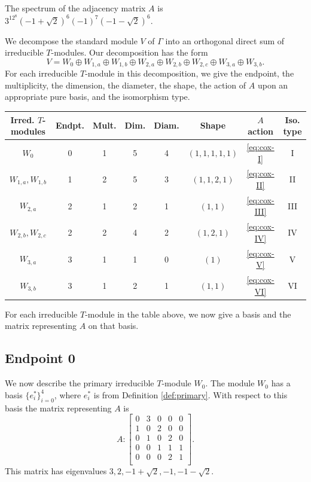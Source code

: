 \documentclass[12pt,letterpaper]{article}
\begin{document}
The spectrum of the adjacency matrix $A$ is $ 3^12^8(-1+\sqrt2)^6(-1)^7(-1-\sqrt2)^6 $.

We decompose the standard module $V$ of $\Gamma$ into an orthogonal direct sum of irreducible $T$-modules. Our decomposition has the form
\[ V = W_0 \oplus W_{1,a} \oplus W_{1,b} \oplus W_{2,a} \oplus W_{2,b} \oplus W_{2,c} \oplus W_{3,a} \oplus W_{3,b}. \]
For each irreducible $T$-module in this decomposition, we give the endpoint, the multiplicity, the dimension, the diameter, the shape, the action of $A$ upon an appropriate pure basis, and the isomorphism type.

\begin{center}
\begin{tabular}{c | c c c c c c c}
\toprule
\textbf{Irred. $T$-modules} & \textbf{Endpt.} & \textbf{Mult.} & \textbf{Dim.} & \textbf{Diam.} & \textbf{Shape} & $A$ \textbf{action} & \textbf{Iso. type} \\
\midrule
$W_0$ & 0 & 1 & 5 & 4 & $(1,1,1,1,1)$ & \eqref{eq:cox-I} & I \\
$W_{1,a}, W_{1,b}$ & 1 & 2 & 5 & 3 & $(1,1,2,1)$ & \eqref{eq:cox-II} & II \\
$W_{2,a}$ & 2 & 1 & 2 & 1 & $(1,1)$ & \eqref{eq:cox-III} & III \\
$W_{2,b}, W_{2,c}$ & 2 & 2 & 4 & 2 & $(1,2,1)$ & \eqref{eq:cox-IV} & IV \\
$W_{3,a}$ & 3 & 1 & 1 & 0 & $(1)$ & \eqref{eq:cox-V} & V \\
$W_{3,b}$ & 3 & 1 & 2 & 1 & $(1,1)$ & \eqref{eq:cox-VI} & VI \\
\bottomrule
\end{tabular}

\smallskip
{}
\end{center}

For each irreducible $T$-module in the table above, we now give a basis and the matrix representing $A$ on that basis. 

\subsection{Endpoint 0}

We now describe the primary irreducible $T$-module $W_0$. The module $W_0$ has a basis $\{e_i^*\}_{i=0}^4$, where $e_i^*$ is from Definition \ref{def:primary}. With respect to this basis the matrix representing $A$ is
\begin{equation}
    A: \begin{bmatrix}
0 & 3 & 0 & 0 & 0 \\
1 & 0 & 2 & 0 & 0 \\
0 & 1 & 0 & 2 & 0 \\
0 & 0 & 1 & 1 & 1 \\
0 & 0 & 0 & 2 & 1 \\
\end{bmatrix}.
\label{eq:cox-I}
\end{equation}
This matrix has eigenvalues $3, 2, -1+\sqrt{2}, -1, -1-\sqrt{2}$.
\end{document}
